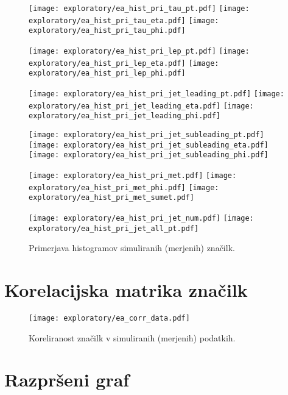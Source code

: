 \begin{figure}[ht]
	\label{hist_prim}

	\texttt{[image: exploratory/ea\_hist\_pri\_tau\_pt.pdf]}	
	\texttt{[image: exploratory/ea\_hist\_pri\_tau\_eta.pdf]}	
	\texttt{[image: exploratory/ea\_hist\_pri\_tau\_phi.pdf]}	
	
	\texttt{[image: exploratory/ea\_hist\_pri\_lep\_pt.pdf]}	
	\texttt{[image: exploratory/ea\_hist\_pri\_lep\_eta.pdf]}	
	\texttt{[image: exploratory/ea\_hist\_pri\_lep\_phi.pdf]}	
	
	\texttt{[image: exploratory/ea\_hist\_pri\_jet\_leading\_pt.pdf]}	
	\texttt{[image: exploratory/ea\_hist\_pri\_jet\_leading\_eta.pdf]}	
	\texttt{[image: exploratory/ea\_hist\_pri\_jet\_leading\_phi.pdf]}	
	
	\texttt{[image: exploratory/ea\_hist\_pri\_jet\_subleading\_pt.pdf]}	
	\texttt{[image: exploratory/ea\_hist\_pri\_jet\_subleading\_eta.pdf]}	
	\texttt{[image: exploratory/ea\_hist\_pri\_jet\_subleading\_phi.pdf]}
	
	
	\texttt{[image: exploratory/ea\_hist\_pri\_met.pdf]}	
	\texttt{[image: exploratory/ea\_hist\_pri\_met\_phi.pdf]}	
	\texttt{[image: exploratory/ea\_hist\_pri\_met\_sumet.pdf]}	
	
	\texttt{[image: exploratory/ea\_hist\_pri\_jet\_num.pdf]}	
	\texttt{[image: exploratory/ea\_hist\_pri\_jet\_all\_pt.pdf]}	

	\caption{Primerjava histogramov simuliranih (merjenih) značilk.}	
	\label{sl:histogram_izmerjene}		
	
\end{figure}

\clearpage

\section{Korelacijska matrika značilk}

\begin{figure}[ht]
	\texttt{[image: exploratory/ea\_corr\_data.pdf]}
	\caption{Koreliranost značilk v simuliranih (merjenih) podatkih.}
	\label{corr_matrix}
\end{figure}


\clearpage

\section{Razpršeni graf}


